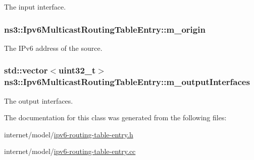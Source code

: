 The input interface. 

\subsubsection[{\texorpdfstring{m\+\_\+origin}{m_origin}}]{ ns3\+::\+Ipv6\+Multicast\+Routing\+Table\+Entry\+::m\+\_\+origin\hspace{0.3cm}{\ttfamily [private]}}\hypertarget{classns3_1_1Ipv6MulticastRoutingTableEntry_adf39d1e8d1d5531f66793258131b6dc1}{}\label{classns3_1_1Ipv6MulticastRoutingTableEntry_adf39d1e8d1d5531f66793258131b6dc1}


The I\+Pv6 address of the source. 

\subsubsection[{\texorpdfstring{m\+\_\+output\+Interfaces}{m_outputInterfaces}}]{\setlength{\rightskip}{0pt plus 5cm}std\+::vector$<$uint32\+\_\+t$>$ ns3\+::\+Ipv6\+Multicast\+Routing\+Table\+Entry\+::m\+\_\+output\+Interfaces\hspace{0.3cm}{\ttfamily [private]}}\hypertarget{classns3_1_1Ipv6MulticastRoutingTableEntry_acf08ac7c14676053f91726482c5c7a39}{}\label{classns3_1_1Ipv6MulticastRoutingTableEntry_acf08ac7c14676053f91726482c5c7a39}


The output interfaces. 



The documentation for this class was generated from the following files\+:\begin{DoxyCompactItemize}
\item 
internet/model/\hyperlink{ipv6-routing-table-entry_8h}{ipv6-\/routing-\/table-\/entry.\+h}\item 
internet/model/\hyperlink{ipv6-routing-table-entry_8cc}{ipv6-\/routing-\/table-\/entry.\+cc}\end{DoxyCompactItemize}
